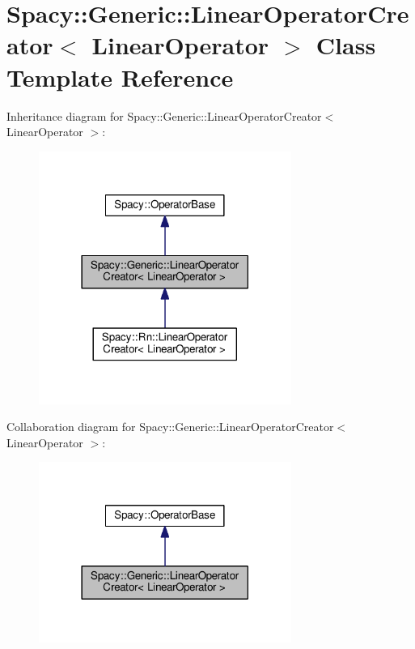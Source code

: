 \hypertarget{classSpacy_1_1Generic_1_1LinearOperatorCreator}{}\section{Spacy\+:\+:Generic\+:\+:Linear\+Operator\+Creator$<$ Linear\+Operator $>$ Class Template Reference}
\label{classSpacy_1_1Generic_1_1LinearOperatorCreator}


Inheritance diagram for Spacy\+:\+:Generic\+:\+:Linear\+Operator\+Creator$<$ Linear\+Operator $>$\+:\nopagebreak
\begin{figure}[H]
\begin{center}
\leavevmode
\includegraphics[width=234pt]{classSpacy_1_1Generic_1_1LinearOperatorCreator__inherit__graph}
\end{center}
\end{figure}


Collaboration diagram for Spacy\+:\+:Generic\+:\+:Linear\+Operator\+Creator$<$ Linear\+Operator $>$\+:\nopagebreak
\begin{figure}[H]
\begin{center}
\leavevmode
\includegraphics[width=234pt]{classSpacy_1_1Generic_1_1LinearOperatorCreator__coll__graph}
\end{center}
\end{figure}
